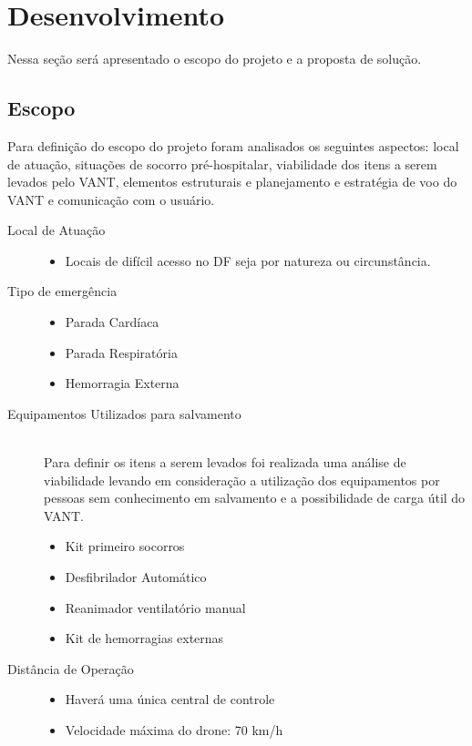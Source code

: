 \chapter{Desenvolvimento}\label{cap2}
 Nessa seção será apresentado o escopo do projeto e a proposta de solução.
\section{Escopo}
Para definição do escopo do projeto foram analisados os seguintes aspectos: local de atuação, situações de socorro pré-hospitalar, viabilidade dos itens a serem levados pelo VANT, elementos estruturais e planejamento e estratégia de voo do VANT e comunicação com o usuário.

\begin{description}
  \item[Local de Atuação] \hfill 
  	\begin{itemize}
  		\item Locais de difícil acesso no DF seja por natureza ou circunstância.
  	\end{itemize}
  \item[Tipo de emergência] \hfill 
  	\begin{itemize}
  		\item Parada Cardíaca
		\item Parada Respiratória
		\item Hemorragia Externa
  	\end{itemize}
  \item[Equipamentos Utilizados para salvamento] \hfill \\
  	Para definir os itens a serem levados foi realizada uma análise de viabilidade levando em consideração a utilização dos equipamentos por pessoas sem conhecimento em salvamento e a possibilidade de carga útil do VANT.
  	\begin{itemize}
  		\item Kit primeiro socorros
		\item Desfibrilador Automático
		\item Reanimador ventilatório manual
		\item Kit de hemorragias externas
  	\end{itemize}
  \item[Distância de Operação] \hfill 
  	\begin{itemize}
  		\item Haverá uma única central de controle
  		\item Velocidade máxima do drone: 70 km/h

\end{itemize}
\end{description}
